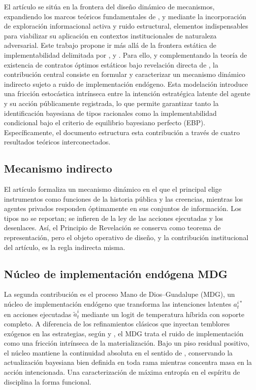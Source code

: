 \documentclass[pdflatex,sn-mathphys-ay]{sn-jnl}
\theoremstyle{thmstyleone}
\theoremstyle{thmstyletwo}
\theoremstyle{thmstylethree}
\newcommand{\1}{\mathbf{1}}
\begin{document}
El artículo se sitúa en la frontera del diseño dinámico de mecanismos, expandiendo los marcos teóricos fundamentales de \citet{CourtyLi2000}, \citet{EsoSzentes2007} y \citet{PavanSegalToikka2014} mediante la incorporación de exploración informacional activa y ruido estructural, elementos indispensables para viabilizar su aplicación en contextos institucionales de naturaleza adversarial. Este trabajo propone ir más allá de la frontera estática de implementabilidad delimitada por \citet{MyersonSatterthwaite1983}, \citet{Rochet1987} y \citet{RochetChone1998}. Para ello, y complementando la teoría de existencia de contratos óptimos estáticos bajo revelación directa de \citet{KadanRenySwinkels2017}, la contribución central consiste en formular y caracterizar un mecanismo dinámico indirecto sujeto a ruido de implementación endógeno. Esta modelación introduce una fricción estocástica intrínseca entre la intención estratégica latente del agente y su acción públicamente registrada, lo que permite garantizar tanto la identificación bayesiana de tipos racionales como la implementabilidad condicional bajo el criterio de equilibrio bayesiano perfecto (EBP). Específicamente, el documento estructura esta contribución a través de cuatro resultados teóricos interconectados.

\subsection*{Mecanismo indirecto}
El artículo formaliza un mecanismo dinámico en el que el principal elige instrumentos como funciones de la historia pública y las creencias, mientras los agentes privados responden óptimamente en sus conjuntos de información. Los tipos no se reportan; se infieren de la ley de las acciones ejecutadas y los desenlaces. Así, el Principio de Revelación se conserva como teorema de representación, pero el objeto operativo de diseño, y la contribución institucional del artículo, es la regla indirecta misma.

\subsection*{Núcleo de implementación endógena MDG}
La segunda contribución es el proceso Mano de Dios--Guadalupe (MDG), un núcleo de implementación endógeno que transforma las intenciones latentes $a_t^{i\ast}$ en acciones ejecutadas $\tilde a_t^i$ mediante un logit de temperatura híbrida con soporte completo. A diferencia de los refinamientos clásicos que inyectan temblores exógenos en las estrategias, según \citet{Selten1975Perfectness} y \citet{KrepsWilson1982}, el MDG trata el ruido de implementación como una fricción intrínseca de la materialización. Bajo un piso residual positivo, el núcleo mantiene la continuidad absoluta en el sentido de \citet{KalaiLehrer1993}, conservando la actualización bayesiana bien definida en toda rama mientras concentra masa en la acción intencionada. Una caracterización de máxima entropía en el espíritu de \citet{Jaynes1957Information} disciplina la forma funcional.
\end{document}
